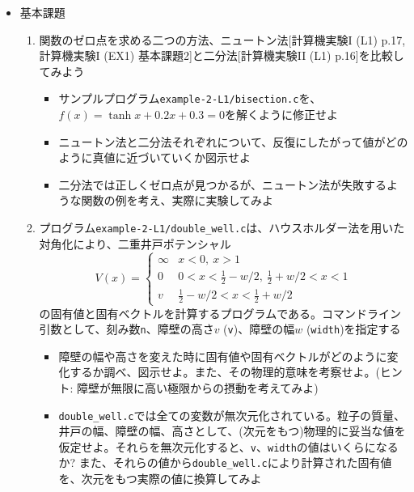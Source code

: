\documentclass[11pt]{jarticle}
\begin{document}
\begin{itemize}
\item 基本課題
  \begin{enumerate}
  \item 関数のゼロ点を求める二つの方法、ニュートン法[計算機実験I (L1) p.17, 計算機実験I (EX1) 基本課題2]と二分法[計算機実験II (L1) p.16]を比較してみよう
    \begin{itemize}
    \item サンプルプログラム{\tt example-2-L1/bisection.c}を、$f(x) = \tanh x+0.2x+0.3=0$を解くように修正せよ
    \item ニュートン法と二分法それぞれについて、反復にしたがって値がどのように真値に近づいていくか図示せよ
    \item 二分法では正しくゼロ点が見つかるが、ニュートン法が失敗するような関数の例を考え、実際に実験してみよ
    \end{itemize}
  \item プログラム{\tt example-2-L1/double\_well.c}は、ハウスホルダー法を用いた対角化により、二重井戸ポテンシャル
    \begin{equation*}
      V(x) = \begin{cases}
        \infty & x < 0, \ x > 1 \\
        0 & 0 < x < \frac{1}{2} - w/2, \ \frac{1}{2} + w/2 < x < 1 \\
        v & \frac{1}{2} - w/2 < x < \frac{1}{2} + w/2
      \end{cases}
    \end{equation*}
    の固有値と固有ベクトルを計算するプログラムである。コマンドライン引数として、刻み数{\tt n}、障壁の高さ$v$ ({\tt v})、障壁の幅$w$ ({\tt width})を指定する
    \begin{itemize}
      \item 障壁の幅や高さを変えた時に固有値や固有ベクトルがどのように変化するか調べ、図示せよ。また、その物理的意味を考察せよ。(ヒント: 障壁が無限に高い極限からの摂動を考えてみよ)
      \item {\tt double\_well.c}では全ての変数が無次元化されている。粒子の質量、井戸の幅、障壁の幅、高さとして、(次元をもつ)物理的に妥当な値を仮定せよ。それらを無次元化すると、{\tt v}、{\tt width}の値はいくらになるか? また、それらの値から{\tt double\_well.c}により計算された固有値を、次元をもつ実際の値に換算してみよ

\end{itemize}
\end{enumerate}
\end{itemize}
\end{document}
